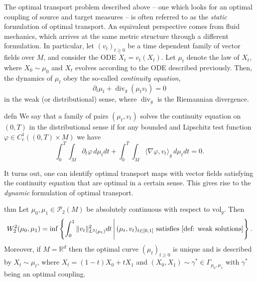 \documentclass[11pt]{article}
\newcommand{\man}{M}
\begin{document}
The optimal transport problem described above -- one which looks for an optimal coupling of source and target measures -- is often referred to as the \textit{static} formulation of optimal transport. An equivalent perspective comes from fluid mechanics, which arrives at the same metric structure through a different formulation. In particular, let $(v_t)_{t \geq 0}$ be a time dependent family of vector fields over $\man$, and consider the ODE $\dot X_t = v_t(X_t)$. Let $\mu_t$ denote the law of $X_t$, where $X_0 \sim \mu_0$ and $X_t$ evolves according to the ODE described previously. Then, the dynamics of $\mu_t$ obey the so-called \textit{continuity equation},
\begin{equation}
    \partial_t\mu_t + \operatorname{div}_g (\mu_t v_t) = 0 \label{eq: balanced continuity eqn}
\end{equation}
in the weak (or distributional) sense, where $\operatorname{div}_g$ is the Riemannian divergence. 
\begin{restatable}{defn}{} \label{def: weak solutions}
    We say that a family of pairs $(\mu_t, v_t)$ solves the continuity equation on $(0, T)$ in the distributional sense if for any bounded and Lipschitz test function $\varphi \in C^1_c((0, T)\times \man)$ we have
    \[\int_0^T\int_{\man} \partial_t\varphi \, d\mu_tdt + \int_0^T\int_{\man} \langle\nabla\varphi,  v_t\rangle_g \, d\mu_tdt = 0.\]
\end{restatable}
It turns out, one can identify optimal transport maps with vector fields satisfying the continuity equation that are optimal in a certain sense. This gives rise to the \textit{dynamic} formulation of optimal transport.
\begin{restatable}{thm}{}
    Let $\mu_0, \mu_1 \in \mathcal{P}_{2}(\man)$ be absolutely continuous with respect to $\text{vol}_g$. Then 
    \begin{equation*}
        W_2^2(\mu_0, \mu_1) = \inf \left\{\int_{0}^1\|v_t\|^2_{L^2(\mu_t)} dt \, \Bigg| \, (\mu_t, v_t)_{t \in [0,1]} \text{ satisfies \cref{def: weak solutions}}\right\}.
    \end{equation*}
    Moreover, if $M = \mathbb{R}^d$ then the optimal curve $(\mu_t)_{t\geq 0}$ is unique and is described by $X_t \sim \mu_t$, where $X_t = (1-t)X_0 + tX_1$ and $(X_0, X_1) \sim \gamma^* \in \Gamma_{\mu_0, \mu_1}$ with $\gamma^*$ being an optimal coupling.
\end{restatable}
\end{document}

